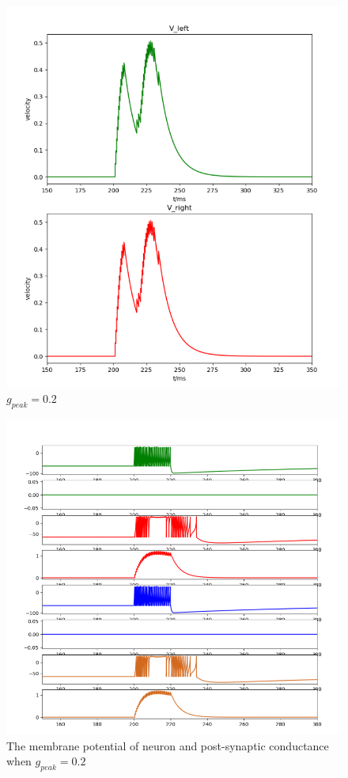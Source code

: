 \documentclass[12pt]{article}
\begin{document}
 \begin{figure}[H]
  \centering
    \includegraphics[width=.8\textwidth]{h3_p2_1500.png} %
  \caption{$g_{peak}=0.2$ }
\end{figure}

\begin{figure}
\centering
      \includegraphics[width=.8\textwidth]{h3_p2_c.png} %
       \caption{The membrane potential of neuron and post-synaptic conductance when $g_{peak}=0.2$ }
  \label{img} %
\end{figure}
\end{document}
